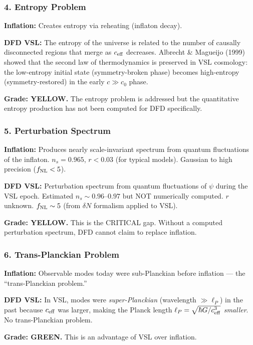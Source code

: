 \documentclass[11pt,a4paper]{article}
\newcommand{\GREEN}{\textcolor{dfdgreen}{\textbf{GREEN}}}
\newcommand{\YELLOW}{\textcolor{dfdyellow}{\textbf{YELLOW}}}
\begin{document}
\subsubsection{4. Entropy Problem}

\textbf{Inflation:} Creates entropy via reheating (inflaton decay).

\textbf{DFD VSL:} The entropy of the universe is related to the number of causally disconnected regions that merge as $c_{\rm eff}$ decreases. Albrecht \& Magueijo (1999) showed that the second law of thermodynamics is preserved in VSL cosmology: the low-entropy initial state (symmetry-broken phase) becomes high-entropy (symmetry-restored) in the early $c \gg c_0$ phase.

\textbf{Grade: \YELLOW.} The entropy problem is addressed but the quantitative entropy production has not been computed for DFD specifically.

\subsubsection{5. Perturbation Spectrum}

\textbf{Inflation:} Produces nearly scale-invariant spectrum from quantum fluctuations of the inflaton. $n_s = 0.965$, $r < 0.03$ (for typical models). Gaussian to high precision ($f_{\rm NL} < 5$).

\textbf{DFD VSL:} Perturbation spectrum from quantum fluctuations of $\psi$ during the VSL epoch. Estimated $n_s \sim 0.96$--$0.97$ but NOT numerically computed. $r$ unknown. $f_{\rm NL} \sim 5$ (from $\delta N$ formalism applied to VSL).

\textbf{Grade: \YELLOW.} This is the CRITICAL gap. Without a computed perturbation spectrum, DFD cannot claim to replace inflation.

\subsubsection{6. Trans-Planckian Problem}

\textbf{Inflation:} Observable modes today were sub-Planckian before inflation --- the ``trans-Planckian problem.''

\textbf{DFD VSL:} In VSL, modes were \emph{super-Planckian} (wavelength $\gg \ell_P$) in the past because $c_{\rm eff}$ was larger, making the Planck length $\ell_P = \sqrt{\hbar G/c_{\rm eff}^3}$ \emph{smaller}. No trans-Planckian problem.

\textbf{Grade: \GREEN.} This is an advantage of VSL over inflation.
\end{document}
